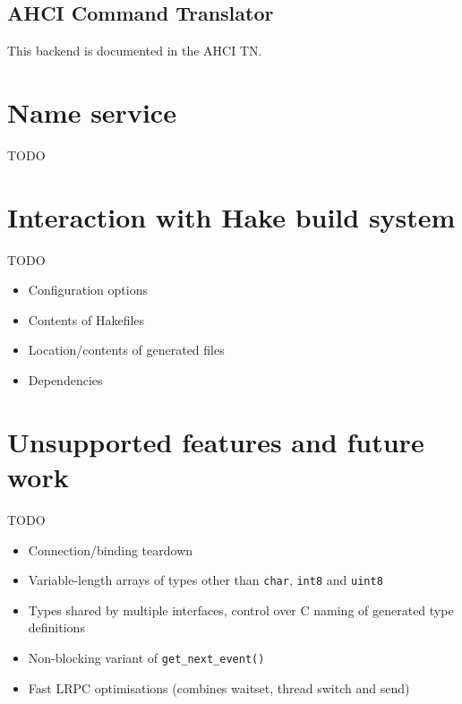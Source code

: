 \documentclass[a4paper,twoside]{report} %
\begin{document}
\section{AHCI Command Translator}
\label{sec:ahci}

This backend is documented in the AHCI TN.

\chapter{Name service}
\label{cha:nameservice}

TODO


\chapter{Interaction with Hake build system}
\label{cha:hake}

TODO

\begin{itemize}
 \item Configuration options
 \item Contents of Hakefiles
 \item Location/contents of generated files
 \item Dependencies
\end{itemize}


\chapter{Unsupported features and future work}

TODO

\begin{itemize}
 \item Connection/binding teardown
 \item Variable-length arrays of types other than \lstinline+char+,
        \lstinline+int8+ and \lstinline+uint8+
 \item Types shared by multiple interfaces, control over C naming of generated
        type definitions
 \item Non-blocking variant of \lstinline+get_next_event()+
 \item Fast LRPC optimisations (combines waitset, thread switch and send)
\end{itemize}

 

\end{document}

